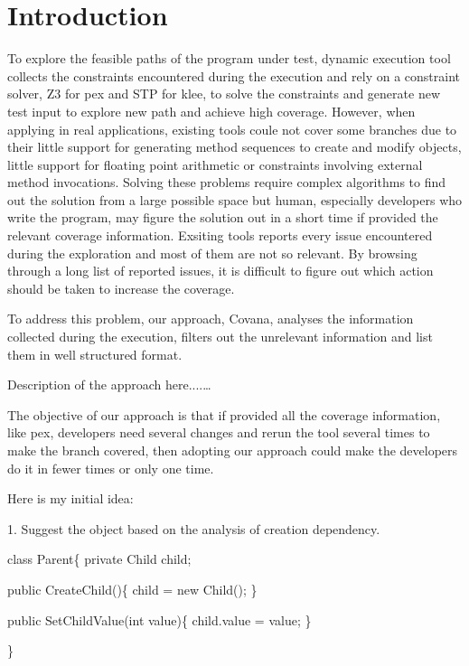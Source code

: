 \section{Introduction}
To explore the feasible paths of the program under test, dynamic execution tool collects the constraints encountered during the execution and rely on a constraint solver, Z3 for pex and STP for klee, to solve the constraints and generate new test input to explore new path and achieve high coverage. However, when applying in real applications, existing tools coule not cover some branches due to their little support for generating method sequences to create and modify objects, little support for floating point arithmetic or constraints involving external method invocations. Solving these problems require complex algorithms to find out the solution from a large possible space but human, especially developers who write the program, may figure the solution out in a short time if provided the relevant coverage information. Exsiting tools reports every issue encountered during the exploration and most of them are not so relevant. By browsing through a long list of reported issues, it is difficult to figure out which action should be taken to increase the coverage. 

To address this problem, our approach, Covana, analyses the information collected during the execution, filters out the unrelevant information and list them in well structured format. 

Description of the approach here....\dots

The objective of our approach is that if provided all the coverage information, like pex, developers need several changes and rerun the tool several times to make the branch covered, then adopting our approach could make the developers do it in fewer times or only one time.

Here is my initial idea:

1. Suggest the object based on the analysis of creation dependency.

\begin{scriptsize}
class Parent\{                                            
private Child child;                                      

public CreateChild()\{                              
	child = new Child();                                               
\}

public SetChildValue(int value)\{                              
	child.value = value;                                              
\}

\}

\end{scriptsize} 

